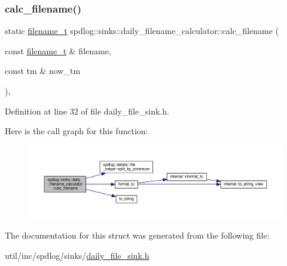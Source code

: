 \subsubsection{\texorpdfstring{calc\+\_\+filename()}{calc\_filename()}}
{\footnotesize\ttfamily static \hyperlink{namespacespdlog_acf7ce125b3622e44f8f1702d699e0b06}{filename\+\_\+t} spdlog\+::sinks\+::daily\+\_\+filename\+\_\+calculator\+::calc\+\_\+filename (\begin{DoxyParamCaption}\item[{const \hyperlink{namespacespdlog_acf7ce125b3622e44f8f1702d699e0b06}{filename\+\_\+t} \&}]{filename,  }\item[{const tm \&}]{now\+\_\+tm }\end{DoxyParamCaption})\hspace{0.3cm}{\ttfamily [inline]}, {\ttfamily [static]}}



Definition at line 32 of file daily\+\_\+file\+\_\+sink.\+h.

Here is the call graph for this function\+:
\nopagebreak
\begin{figure}[H]
\begin{center}
\leavevmode
\includegraphics[width=350pt]{structspdlog_1_1sinks_1_1daily__filename__calculator_ae8461e586d3426987a3b11a00b158db2_cgraph}
\end{center}
\end{figure}


The documentation for this struct was generated from the following file\+:\begin{DoxyCompactItemize}
\item 
util/inc/spdlog/sinks/\hyperlink{daily__file__sink_8h}{daily\+\_\+file\+\_\+sink.\+h}\end{DoxyCompactItemize}
